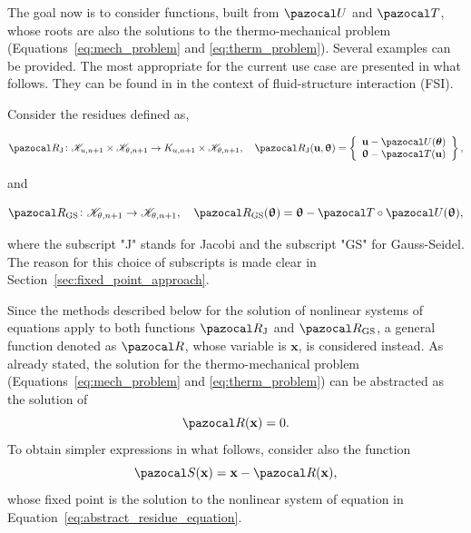 The goal now is to consider functions, built from \(\pazocal U\) and \(\pazocal T\), whose roots are also the solutions to the thermo-mechanical problem (Equations~\eqref{eq:mech_problem} and \eqref{eq:therm_problem}).
Several examples can be provided.
The most appropriate for the current use case are presented in what follows.
They can be found in \cite{uekermann_partitioned_2016} in the context of fluid-structure interaction (FSI).

Consider the residues defined as,
\begin{highlight}
\begin{equation} \label{eq:def_res_jacobi}
  \pazocal R_\text{J}\colon \mathscr K_{u,n+1}\times\mathscr K_{\theta,n+1} \to K_{u,n+1}\times\mathscr K_{\theta,n+1},\quad  \pazocal R_\text{J}(\mathbf u, \bm \uptheta) =
  \left\{\begin{array}{c}
  \mathbf u - \pazocal U(\bm \theta)\\
  \bm \uptheta - \pazocal T(\mathbf u)
  \end{array}\right\},
\end{equation}
\end{highlight}
and
\begin{highlight}
\begin{equation} \label{eq:def_res_gauss_seidel}
  \pazocal R_\text{GS}\colon \mathscr K_{\theta,n+1} \to\mathscr K_{\theta,n+1},\quad \pazocal R_\text{GS}(\bm \uptheta) =
  \bm \uptheta - \pazocal T\circ \pazocal U(\bm \uptheta),
\end{equation}
\end{highlight}
where the subscript "J" stands for Jacobi and the subscript "GS" for Gauss-Seidel.
The reason for this choice of subscripts is made clear in Section~\ref{sec:fixed_point_approach}.


Since the methods described below for the solution of nonlinear systems of equations apply to both functions \(\pazocal R_\mathrm{J}\) and \(\pazocal R_\mathrm{GS}\), a general function denoted as \(\pazocal R\), whose variable is \(\mathbf x\), is considered instead.
As already stated, the solution for the thermo-mechanical problem (Equations~\eqref{eq:mech_problem} and \eqref{eq:therm_problem}) can be abstracted as the solution of
\begin{equation} \label{eq:abstract_residue_equation}
  \pazocal R(\mathbf x) = 0.
\end{equation}
To obtain simpler expressions in what follows, consider also the function
\begin{equation}
\pazocal S(\mathbf x) = \mathbf x - \pazocal R(\mathbf x),
\end{equation}
whose fixed point is the solution to the nonlinear system of equation in Equation~\eqref{eq:abstract_residue_equation}.

